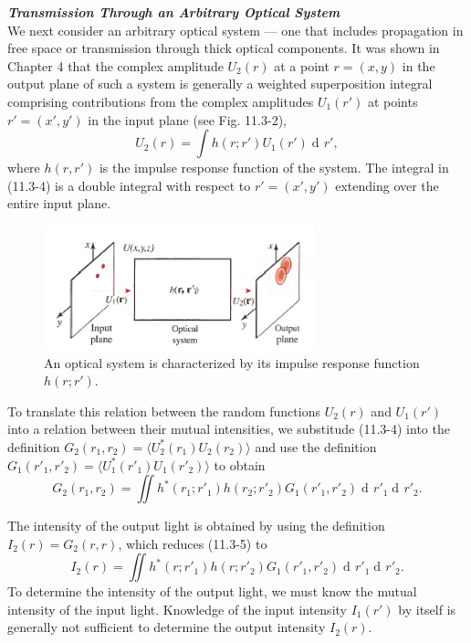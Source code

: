 \documentclass{article}
\numberwithin{figure}{subsection}
\numberwithin{table}{subsection}
\DeclareMathOperator\dif{d\!}
\begin{document}
\bigbreak\noindent\textcolor{ksc}{\textbf{\textsl{Transmission Through an Arbitrary Optical System}}}\\
We next consider an arbitrary optical system --- one that includes propagation in free space or transmission through thick optical components. It was shown in Chapter 4 that the complex amplitude $U_2 (r)$ at a point $r = (x,y)$ in the output plane of such a system is generally a weighted superposition integral comprising contributions from the complex amplitudes $U_1 (r')$ at points $r' = (x', y')$ in the input plane (see Fig. 11.3-2),
\begin{equation}
U_2 (r) = \int h(r; r') U_1 (r') \dif r' ,
\end{equation}
where $h(r, r')$ is the impulse response function of the system. The integral in (11.3-4) is a double integral with respect to $r' = (x', y')$ extending over the entire input plane.
\begin{figure}[H]
\centering
\includegraphics[width=0.7\textwidth]{11_3_2.PNG}
\caption{An optical system is characterized by its impulse response function $h(r; r')$.}
\label{fig: 11_3_2}
\end{figure}
\par To translate this relation between the random functions $U_2 (r)$ and  $U_1 (r')$ into a relation between their mutual intensities, we substitude (11.3-4) into the definition $G_2 (r_1, r_2) = \langle U_2^\ast (r_1) U_2(r_2) \rangle$
and use the definition $G_1(r'_1, r'_2) = \langle U_1^\ast (r'_1) U_1(r'_2) \rangle$ to obtain
\begin{equation}
G_2 (r_1, r_2) = \iint h^\ast (r_1; r'_1) h(r_2; r'_2) G_1 (r'_1, r'_2) \dif r'_1 \dif r'_2 .
\end{equation}
\par The intensity of the output light is obtained by using the definition $I_2 (r) = G_2 (r, r)$, which reduces (11.3-5) to
\begin{equation}
I_2 (r) = \iint h^\ast (r; r'_1) h(r; r'_2) G_1 (r'_1, r'_2) \dif r'_1 \dif r'_2 .
\end{equation}
To determine the intensity of the output light, we must know the mutual intensity of the input light. Knowledge of the input intensity $I_1 (r')$ by itself is generally not sufficient to determine the output intensity $I_2 (r)$.
\end{document}
